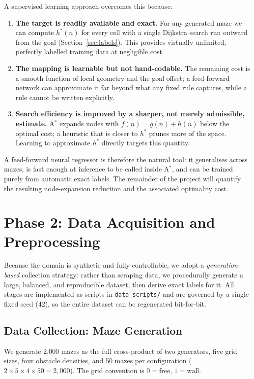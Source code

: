 \documentclass[11pt]{article}
\begin{document}
A supervised learning approach overcomes this because:

\begin{enumerate}
  \item \textbf{The target is readily available and exact.} For any generated maze we can
  compute $h^\ast(n)$ for every cell with a single Dijkstra search run outward from the
  goal (Section~\ref{sec:labels}). This provides virtually unlimited, perfectly labelled
  training data at negligible cost.
  \item \textbf{The mapping is learnable but not hand-codable.} The remaining cost is a
  smooth function of local geometry and the goal offset; a feed-forward network can
  approximate it far beyond what any fixed rule captures, while a rule cannot be written
  explicitly.
  \item \textbf{Search efficiency is improved by a sharper, not merely admissible,
  estimate.} A$^\ast$ expands nodes with $f(n)=g(n)+h(n)$ below the optimal cost; a
  heuristic that is closer to $h^\ast$ prunes more of the space. Learning to approximate
  $h^\ast$ directly targets this quantity.
\end{enumerate}

A feed-forward neural regressor is therefore the natural tool: it generalises across
mazes, is fast enough at inference to be called inside A$^\ast$, and can be trained
purely from automatic exact labels. The remainder of the project will quantify the
resulting node-expansion reduction and the associated optimality cost.

\section{Phase 2: Data Acquisition and Preprocessing}
Because the domain is synthetic and fully controllable, we adopt a \emph{generation-based}
collection strategy: rather than scraping data, we procedurally generate a large,
balanced, and reproducible dataset, then derive exact labels for it. All stages are
implemented as scripts in \texttt{data\_scripts/} and are governed by a single fixed seed
(42), so the entire dataset can be regenerated bit-for-bit.

\subsection{Data Collection: Maze Generation}
We generate 2{,}000 mazes as the full cross-product of two generators, five grid sizes,
four obstacle densities, and 50 mazes per configuration
($2 \times 5 \times 4 \times 50 = 2{,}000$). The grid convention is
$0=\text{free}$, $1=\text{wall}$.
\end{document}

